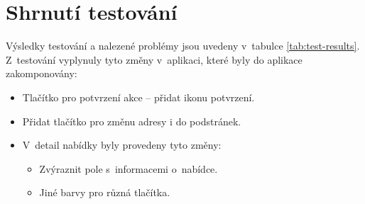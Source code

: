 \section{Shrnutí testování}
Výsledky testování a nalezené problémy jsou uvedeny v~tabulce \ref{tab:test-results}. Z~testování vyplynuly tyto změny v~aplikaci, které byly do aplikace zakomponovány:

\begin{itemize}
    \item Tlačítko pro potvrzení akce -- přidat ikonu potvrzení.
    \item Přidat tlačítko pro změnu adresy i do podstránek.
    \item V~detail nabídky byly provedeny tyto změny:
    \begin{itemize}
        \item Zvýraznit pole s~informacemi o~nabídce.
        \item Jiné barvy pro různá tlačítka.
    \end{itemize}
\end{itemize}

